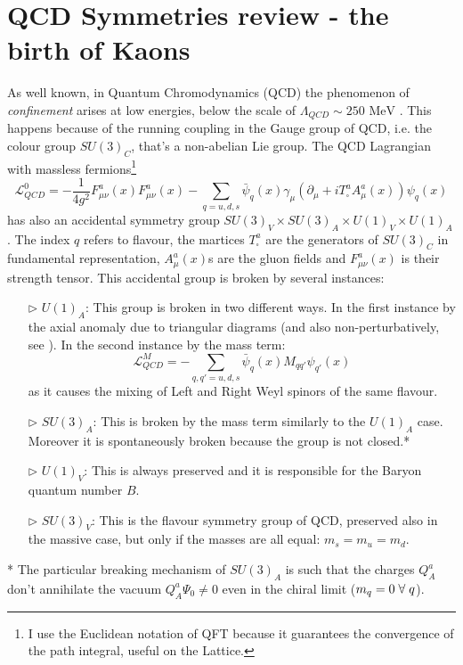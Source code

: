\documentclass[english, LaM, oneside, noexaminfo]{sapthesis}
\newcommand{\mev}{\text{ MeV}}
\newcommand{\spc}{\hspace*{1mm}}
\begin{document}
\section{QCD Symmetries review - the birth of Kaons}
\noindent
As well known, in Quantum Chromodynamics (QCD) the phenomenon of \textit{confinement} arises at low energies, below the scale of $\Lambda_{QCD} \sim 250 \mev$ \cite{WeinbergII}.
This happens because of the running coupling in the Gauge group of QCD, i.e. the colour group $SU(3)_C$, that's a non-abelian Lie group.
The QCD Lagrangian with massless fermions\footnote{I use the Euclidean notation of QFT because it guarantees the convergence of the path integral, useful on the Lattice.}
\begin{equation}\label{eq:masslessQCD}
    \mathcal{L}_{QCD}^0 = -\frac{1}{4g^2} F_{\mu\nu}^a(x)F_{\mu\nu}^a(x) - \sum_{q = u,d,s} \bar\psi_q (x) \gamma_\mu \left( \partial_\mu + i T^a_{\square} A_\mu^a (x) \right) \psi_q (x)
\end{equation}
has also an accidental symmetry group $SU(3)_V \times SU(3)_A \times U(1)_V \times U(1)_A$.
The index $q$ refers to flavour, the martices $T^a_{\square}$ are the generators of $SU(3)_C$ in fundamental representation, $A_\mu^a (x) $s are the gluon fields and $F_{\mu\nu}^a(x)$ is their strength tensor.
This accidental group is broken by several instances:
\begin{itemize}
    \item [$\triangleright$] $U(1)_A$: This group is broken in two different ways. In the first instance by the axial anomaly due to triangular diagrams (and also non-perturbatively, see \cite{FujikawaI}\cite{FujikawaII}).
            In the second instance by the mass term: $$\mathcal{L}_{QCD}^M = - \sum_{q,q' = u,d,s} \bar\psi_q (x) M_{qq'} \psi_{q'} (x)$$ as it causes the mixing of Left and Right Weyl spinors of the same flavour.
    \item [$\triangleright$] $SU(3)_A$: This is broken by the mass term similarly to the $U(1)_A$ case.
            Moreover it is spontaneously broken because the group is not closed.*
    \item [$\triangleright$] $U(1)_V$: This is always preserved and it is responsible for the Baryon quantum number $B$.
    \item [$\triangleright$] $SU(3)_V$: This is the flavour symmetry group of QCD, preserved also in the massive case, but only if the masses are all equal: $m_s = m_u = m_d$.
\end{itemize}
* The particular breaking mechanism of $SU(3)_A$ is such that the charges $Q^a_A$ don't annihilate the vacuum $Q^a_A \Psi_0 \ne 0$ even in the chiral limit ($m_q = 0 \spc \forall \spc q$).
\end{document}
